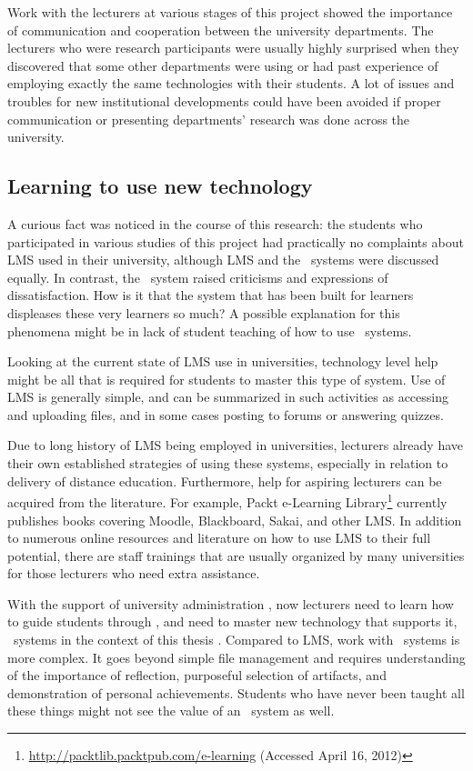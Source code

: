 Work with the lecturers at various stages of this project showed the importance
of communication and cooperation between the university departments. The
lecturers who were research participants were usually highly surprised when they
discovered that some other departments were using or had past experience of
employing exactly the same technologies with their students. A lot of issues and
troubles for new institutional developments could have been avoided if proper
communication or presenting departments' research was done across the university.

\subsection[Learning to Use New Technology]{Learning to use new technology}

A curious fact was noticed in the course of this research: the students who
participated in various studies of this project had practically no complaints
about LMS used in their university, although LMS and the \ep~systems were
discussed equally. In contrast, the \ep~system raised criticisms and expressions
of dissatisfaction. How is it that the system that has been built for learners
displeases these very learners so much? A possible explanation for this
phenomena might be in lack of student teaching of how to use \ep~systems.

Looking at the current state of LMS use in universities, technology level help
might be all that is required for students to master this type of system. Use of
LMS is generally simple, and can be summarized in such activities as accessing
and uploading files, and in some cases posting to forums or answering quizzes.

Due to long history of LMS being employed in universities, lecturers already
have their own established strategies of using these systems, especially in
relation to delivery of distance education. Furthermore, help for aspiring
lecturers can be acquired from the literature. For example, Packt e-Learning
Library\footnote{\url{http://packtlib.packtpub.com/e-learning} (Accessed April
16, 2012)} currently publishes books covering Moodle, Blackboard, Sakai, and
other LMS. In addition to numerous online resources and literature on how to use
LMS to their full potential, there are staff trainings that are usually
organized by many universities for those lecturers who need extra assistance.

With the support of university administration \citep{DiBenedetto2005}, now
lecturers need to learn how to guide students through \LLLsn, and need to master
new technology that supports it, \ep~systems in the context of this thesis
\citep{Levin2008}. Compared to LMS, work with \ep~systems is more complex. It
goes beyond simple file management and requires understanding of the importance
of reflection, purposeful selection of artifacts, and demonstration of personal
achievements. Students who have never been taught all these things might not see
the value of an \ep~system as well.

